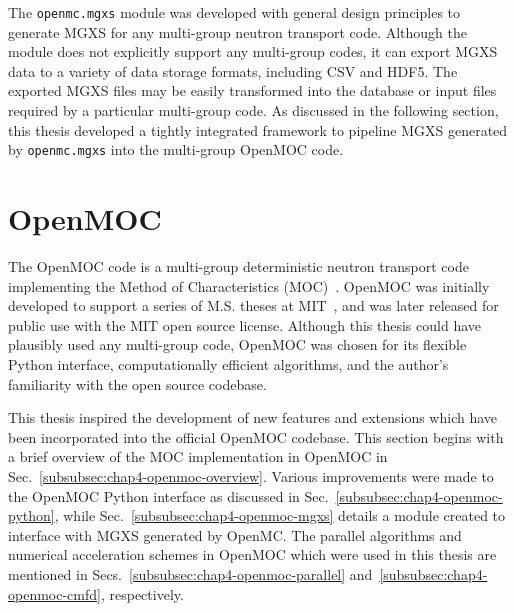 The \texttt{openmc.mgxs} module was developed with general design principles to generate \ac{MGXS} for any multi-group neutron transport code. Although the module does not explicitly support any multi-group codes, it can export \ac{MGXS} data to a variety of data storage formats, including \ac{CSV} and \ac{HDF5}. The exported \ac{MGXS} files may be easily transformed into the database or input files required by a particular multi-group code. As discussed in the following section, this thesis developed a tightly integrated framework to pipeline \ac{MGXS} generated by \texttt{openmc.mgxs} into the multi-group OpenMOC code.


\section{OpenMOC}
\label{sec:chap4-openmoc}

The OpenMOC code is a multi-group deterministic neutron transport code implementing the Method of Characteristics (MOC)~\cite{boyd2014openmoc}. OpenMOC was initially developed to support a series of M.S. theses at MIT~\cite{li2013ms,boyd2014ms,shaner2014ms}, and was later released for public use with the MIT open source license. Although this thesis could have plausibly used any multi-group code, OpenMOC was chosen for its flexible Python interface, computationally efficient algorithms, and the author's familiarity with the open source codebase.


This thesis inspired the development of new features and extensions which have been incorporated into the official OpenMOC codebase. This section begins with a brief overview of the \ac{MOC} implementation in OpenMOC in Sec.~\ref{subsubsec:chap4-openmoc-overview}. Various improvements were made to the OpenMOC Python interface as discussed in Sec.~\ref{subsubsec:chap4-openmoc-python}, while Sec.~\ref{subsubsec:chap4-openmoc-mgxs} details a module created to interface with \ac{MGXS} generated by OpenMC. The parallel algorithms and numerical acceleration schemes in OpenMOC which were used in this thesis are mentioned in Secs.~\ref{subsubsec:chap4-openmoc-parallel} and~\ref{subsubsec:chap4-openmoc-cmfd}, respectively.


